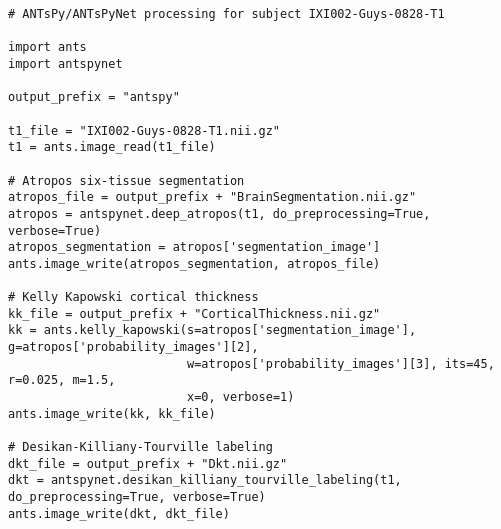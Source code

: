 


\begin{lstlisting}
# ANTsPy/ANTsPyNet processing for subject IXI002-Guys-0828-T1

import ants
import antspynet

output_prefix = "antspy"

t1_file = "IXI002-Guys-0828-T1.nii.gz"
t1 = ants.image_read(t1_file)

# Atropos six-tissue segmentation
atropos_file = output_prefix + "BrainSegmentation.nii.gz"
atropos = antspynet.deep_atropos(t1, do_preprocessing=True, verbose=True)
atropos_segmentation = atropos['segmentation_image']
ants.image_write(atropos_segmentation, atropos_file)

# Kelly Kapowski cortical thickness
kk_file = output_prefix + "CorticalThickness.nii.gz"
kk = ants.kelly_kapowski(s=atropos['segmentation_image'], g=atropos['probability_images'][2],
                         w=atropos['probability_images'][3], its=45, r=0.025, m=1.5,
                         x=0, verbose=1)
ants.image_write(kk, kk_file)

# Desikan-Killiany-Tourville labeling
dkt_file = output_prefix + "Dkt.nii.gz"
dkt = antspynet.desikan_killiany_tourville_labeling(t1, do_preprocessing=True, verbose=True)
ants.image_write(dkt, dkt_file)
\end{lstlisting}




